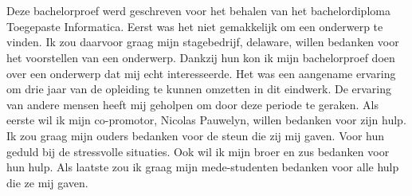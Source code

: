 
\chapter*{}
\label{ch:voorwoord}

Deze bachelorproef werd geschreven voor het behalen van het bachelordiploma Toegepaste Informatica. Eerst was het niet gemakkelijk om een onderwerp te vinden. Ik zou daarvoor graag mijn stagebedrijf, delaware, willen bedanken voor het voorstellen van een onderwerp. Dankzij hun kon ik mijn bachelorproef doen over een onderwerp dat mij echt interesseerde. Het was een aangename ervaring om drie jaar van de opleiding te kunnen omzetten in dit eindwerk. De ervaring van andere mensen heeft mij geholpen om door deze periode te geraken.
Als eerste wil ik mijn co-promotor, Nicolas Pauwelyn, willen bedanken voor zijn hulp.
Ik zou graag mijn ouders bedanken voor de steun die zij mij gaven. Voor hun geduld bij de stressvolle situaties. Ook wil ik mijn broer en zus bedanken voor hun hulp.
Als laatste zou ik graag mijn mede-studenten bedanken voor alle hulp die ze mij gaven. 
